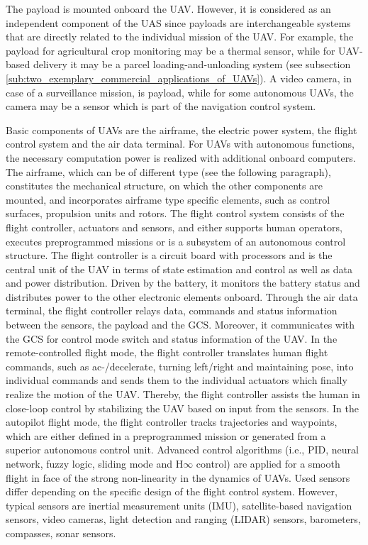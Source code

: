 The payload is mounted onboard the UAV.
However, it is considered as an independent component of the UAS since payloads are interchangeable systems 
that are directly related to the individual mission of the UAV.
For example, the payload for agricultural crop monitoring may be a thermal sensor,
while for UAV-based delivery it may be a parcel loading-and-unloading system (see subsection \ref{sub:two_exemplary_commercial_applications_of_UAVs}).
A video camera, in case of a surveillance mission, is payload, 
while for some autonomous UAVs, the camera may be a sensor which is part of the navigation control system.

Basic components of UAVs are the airframe, the electric power system, the flight control system and the air data terminal.
For UAVs with autonomous functions, the necessary computation power is realized with additional onboard computers.
The airframe, which can be of different type (see the following paragraph),
constitutes the mechanical structure, on which the other components are mounted,
and incorporates airframe type specific elements, such as control surfaces, propulsion units and rotors.
The flight control system consists of the flight controller, actuators and sensors,
and either supports human operators, executes preprogrammed missions or is a subsystem of an autonomous control structure.
The flight controller is a circuit board with processors and
is the central unit of the UAV in terms of state estimation and control as well as data and power distribution.
Driven by the battery, it monitors the battery status and distributes power to the other electronic elements onboard.
Through the air data terminal, the flight controller relays data, commands and status information between the sensors, the payload and the GCS.
Moreover, it communicates with the GCS for control mode switch and status information of the UAV.
In the remote-controlled flight mode, the flight controller translates human flight commands,
such as ac-/decelerate, turning left/right and maintaining pose, 
into individual commands and sends them to the individual actuators which finally realize the motion of the UAV.
Thereby, the flight controller assists the human in close-loop control by stabilizing the UAV based on input from the sensors.
In the autopilot flight mode, the flight controller tracks trajectories and waypoints,
which are either defined in a preprogrammed mission or generated from a superior autonomous control unit.
Advanced control algorithms (i.e., PID, neural network, fuzzy logic, sliding mode and H$\infty$  control)
are applied for a smooth flight in face of the strong non-linearity in the dynamics of UAVs. \cite{Chao2010}
Used sensors differ depending on the specific design of the flight control system.
However, typical sensors are inertial measurement units (IMU), satellite-based navigation sensors, 
video cameras, light detection and ranging (LIDAR) sensors, barometers, compasses, sonar sensors.


